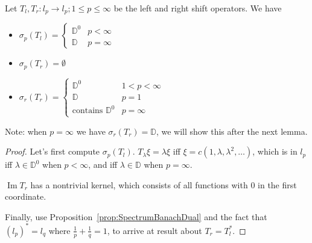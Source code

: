 \begin{proposition}
	Let $T_l, T_r: l_p \to l_p; 1 \le p \le \infty $ be the left and right shift operators. We have
	\begin{itemize}
		\item $\sigma_p(T_l) = \begin{cases}
				\mathbb{D}^0 & p < \infty \\
				\mathbb{D} & p = \infty 
		\end{cases}$ 
		\item $\sigma_p(T_r) = \emptyset $
		\item $\sigma_r(T_r) = \begin{cases}
				\mathbb{D}^0 & 1 < p < \infty \\
				\mathbb{D} & p = 1 \\
				\text{contains } \mathbb{D}^0 & p = \infty 
		\end{cases}$ 
	\end{itemize}
	Note: when $p = \infty $ we have $\sigma_r(T_r) = \mathbb{D}$, we will show this after the next lemma.

\end{proposition}
\begin{proof}
	
	Let's first compute $\sigma_p(T_l)$. $T_\lambda \xi = \lambda \xi$ iff $\xi = c\left( 1, \lambda, \lambda^2, \ldots \right) $, which is in $l_p$ iff $\lambda \in \mathbb{D}^0$  when $p < \infty $, and iff $\lambda \in \mathbb{D}$ when $p = \infty $.

	$\operatorname{Im} T_r$ has a nontrivial kernel, which consists of all functions with 0 in the first coordinate.

	Finally, use Proposition~\ref{prop:SpectrumBanachDual} and the fact that $(l_p)^* = l_q$ where $\frac{1}{p} + \frac{1}{q} = 1$, to arrive at result about $T_r = T_l^*$.
\end{proof}




